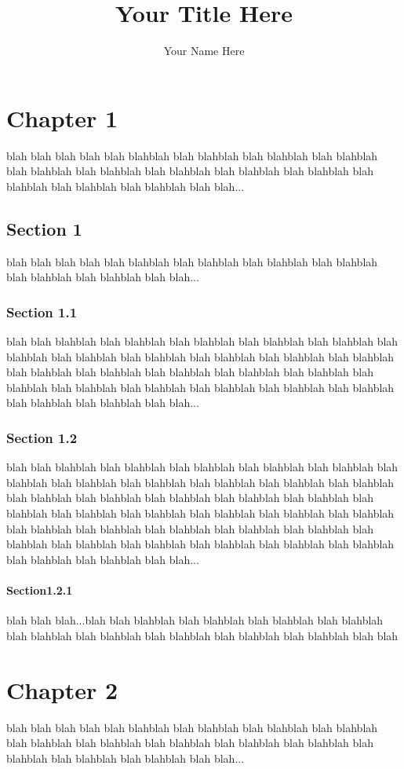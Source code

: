 \documentclass{report}
\author{Your Name Here}
\title{Your Title Here}
\begin{document}
\maketitle
\tableofcontents
\chapter{Chapter 1}
blah blah blah blah blah blahblah blah blahblah blah blahblah blah blahblah blah blahblah blah blahblah blah blahblah blah blahblah blah blahblah blah blahblah blah blahblah blah blahblah blah blah...
\section{Section 1}
blah blah blah blah blah blahblah blah blahblah blah blahblah blah blahblah blah blahblah blah blahblah blah blah...
\subsection{Section 1.1}
blah blah blahblah blah blahblah blah blahblah blah blahblah blah blahblah blah blahblah blah blahblah blah blahblah blah blahblah blah blahblah blah blahblah blah blahblah blah blahblah blah blahblah blah blahblah blah blahblah blah blahblah blah blahblah blah blahblah blah blahblah blah blahblah blah blahblah blah blahblah blah blahblah blah blah...
\subsection{Section 1.2}
blah blah blahblah blah blahblah blah blahblah blah blahblah blah blahblah blah blahblah blah blahblah blah blahblah blah blahblah blah blahblah blah blahblah blah blahblah blah blahblah blah blahblah blah blahblah blah blahblah blah blahblah blah blahblah blah blahblah blah blahblah blah blahblah blah blahblah blah blahblah blah blahblah blah blahblah blah blahblah blah blahblah blah blahblah blah blahblah blah blahblah blah blahblah blah blahblah blah blahblah blah blahblah blah blahblah blah blah...
\subsubsection{Section1.2.1}
blah blah blah...blah blah blahblah blah blahblah blah blahblah blah blahblah blah blahblah blah blahblah blah blahblah blah blahblah blah blahblah blah blah
\chapter{Chapter 2}
blah blah blah blah blah blahblah blah blahblah blah blahblah blah blahblah blah blahblah blah blahblah blah blahblah blah blahblah blah blahblah blah blahblah blah blahblah blah blahblah blah blah...
\end{document}
